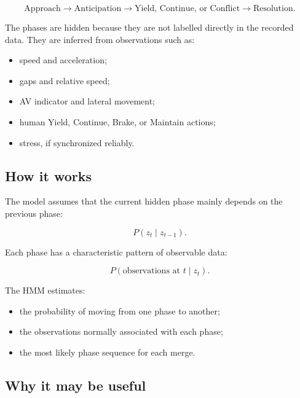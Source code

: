 \documentclass[11pt,a4paper]{article}
\begin{document}
\begin{equation}
\text{Approach}
\longrightarrow
\text{Anticipation}
\longrightarrow
\text{Yield, Continue, or Conflict}
\longrightarrow
\text{Resolution}.
\end{equation}

The phases are hidden because they are not labelled directly in the recorded data. They are inferred from observations such as:

\begin{itemize}[noitemsep]
  \item speed and acceleration;
  \item gaps and relative speed;
  \item AV indicator and lateral movement;
  \item human Yield, Continue, Brake, or Maintain actions;
  \item stress, if synchronized reliably.
\end{itemize}

\subsection{How it works}

The model assumes that the current hidden phase mainly depends on the previous phase:

\begin{equation}
P(z_t\mid z_{t-1}).
\end{equation}

Each phase has a characteristic pattern of observable data:

\begin{equation}
P(\text{observations at }t\mid z_t).
\end{equation}

The HMM estimates:

\begin{itemize}[noitemsep]
  \item the probability of moving from one phase to another;
  \item the observations normally associated with each phase;
  \item the most likely phase sequence for each merge.
\end{itemize}

\subsection{Why it may be useful}
\end{document}
